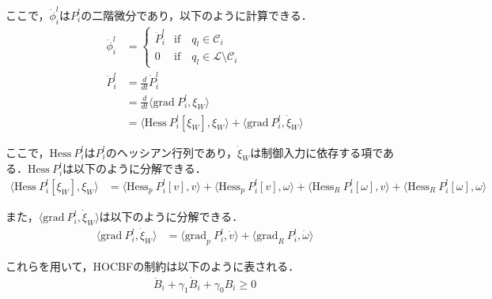 ここで，$\ddot{\phi}^l_{i}$は$P_i^l$の二階微分であり，以下のように計算できる．
\begin{equation}
\begin{aligned}
\ddot{\phi}^l_{i} &= \left\{ \begin{array}{ll}
\ddot{P}_i^l & \mathrm{if} \quad q_l \in \mathcal{C}_i \\
0 & \mathrm{if} \quad q_l \in \mathcal{L} \setminus \mathcal{C}_i
\end{array} \right. \\
\ddot{P}_i^l &= \frac{d}{dt} \dot{P}_i^l \\
&= \frac{d}{dt} \langle \mathrm{grad}\:P_i^l, \xi_W \rangle \\
&= \langle \mathrm{Hess}\:P_i^l[\xi_W], \xi_W \rangle + \langle \mathrm{grad}\:P_i^l, \dot{\xi}_W \rangle
\label{eq:probability_second_derivative}
\end{aligned}
\end{equation}

ここで，$\mathrm{Hess}\:P_i^l$は$P_i^l$のヘッシアン行列であり，$\dot{\xi}_W$は制御入力に依存する項である．$\mathrm{Hess}\:P_i^l$は以下のように分解できる．
\begin{equation}
\begin{aligned}
\langle \mathrm{Hess}\:P_i^l[\xi_W], \xi_W \rangle &= \langle \mathrm{Hess}_p\:P_i^l[v], v \rangle + \langle \mathrm{Hess}_p\:P_i^l[v], \omega \rangle + \langle \mathrm{Hess}_R\:P_i^l[\omega], v \rangle + \langle \mathrm{Hess}_R\:P_i^l[\omega], \omega \rangle
\label{eq:hessian_decomposition}
\end{aligned}
\end{equation}

また，$\langle \mathrm{grad}\:P_i^l, \dot{\xi}_W \rangle$は以下のように分解できる．
\begin{equation}
\begin{aligned}
\langle \mathrm{grad}\:P_i^l, \dot{\xi}_W \rangle &= \langle \mathrm{grad}_p\:P_i^l, \dot{v} \rangle + \langle \mathrm{grad}_R\:P_i^l, \dot{\omega} \rangle
\label{eq:grad_dot_xi}
\end{aligned}
\end{equation}

これらを用いて，HOCBFの制約は以下のように表される．
\begin{equation}
\begin{aligned}
\ddot{B}_i + \gamma_1 \dot{B}_i + \gamma_0 B_i \geq 0
\label{eq:hocbf_constraint_multi}
\end{aligned}
\end{equation}

